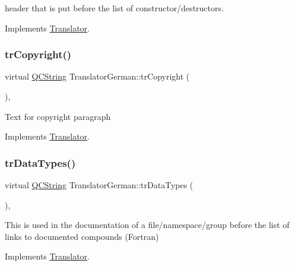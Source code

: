header that is put before the list of constructor/destructors. 

Implements \mbox{\hyperlink{class_translator}{Translator}}.

\mbox{\label{class_translator_german_a13ee81537aed375dfc8abc9d5e3c380f}} 
\subsubsection{\texorpdfstring{trCopyright()}{trCopyright()}}
{\footnotesize\ttfamily virtual \mbox{\hyperlink{class_q_c_string}{Q\+C\+String}} Translator\+German\+::tr\+Copyright (\begin{DoxyParamCaption}{ }\end{DoxyParamCaption})\hspace{0.3cm}{\ttfamily [inline]}, {\ttfamily [virtual]}}

Text for copyright paragraph 

Implements \mbox{\hyperlink{class_translator}{Translator}}.

\mbox{\label{class_translator_german_a74a8536e0227caf31ce07dee701c542a}} 
\subsubsection{\texorpdfstring{trDataTypes()}{trDataTypes()}}
{\footnotesize\ttfamily virtual \mbox{\hyperlink{class_q_c_string}{Q\+C\+String}} Translator\+German\+::tr\+Data\+Types (\begin{DoxyParamCaption}{ }\end{DoxyParamCaption})\hspace{0.3cm}{\ttfamily [inline]}, {\ttfamily [virtual]}}

This is used in the documentation of a file/namespace/group before the list of links to documented compounds (Fortran) 

Implements \mbox{\hyperlink{class_translator}{Translator}}.

\mbox{\label{class_translator_german_af8740d3be4ae5ee2f6ebfeb3c9a75106}} 
